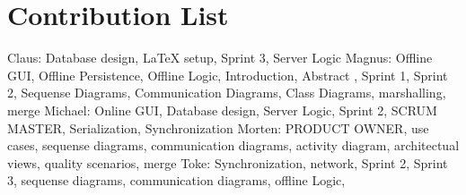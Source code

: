 \section{Contribution List}
Claus: Database design,  LaTeX setup, Sprint 3, Server Logic
Magnus: Offline GUI, Offline Persistence, Offline Logic, Introduction, Abstract , Sprint 1,  Sprint 2, Sequense Diagrams, Communication Diagrams, Class Diagrams, marshalling, merge
Michael: Online GUI, Database design, Server Logic, Sprint 2, SCRUM MASTER, Serialization, Synchronization 
Morten: PRODUCT OWNER, use cases, sequense diagrams, communication diagrams, activity diagram, architectual views, quality scenarios, merge
Toke: Synchronization, network, Sprint 2, Sprint 3, sequense diagrams, communication diagrams, offline Logic, 